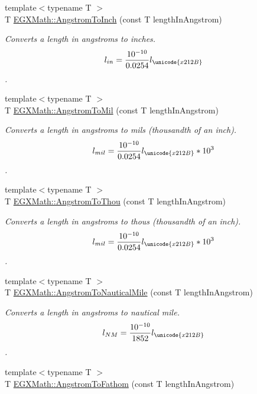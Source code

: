 \begin{DoxyCompactItemize}
{\footnotesize template$<$typename T $>$ }\\T \mbox{\hyperlink{group___e_g_x_math-_conversions-_length_conversions-_non-_s_i-_angstrom-_imperial_ga7866f39e7fdf861be15eda81aa1b3f0c}{E\+G\+X\+Math\+::\+Angstrom\+To\+Inch}} (const T length\+In\+Angstrom)
\begin{DoxyCompactList}\small\item\em Converts a length in angstroms to inches. \[ l_{in}= \frac{10^{-10}}{0.0254} l_{\unicode{x212B}} \]. \end{DoxyCompactList}\item 
{\footnotesize template$<$typename T $>$ }\\T \mbox{\hyperlink{group___e_g_x_math-_conversions-_length_conversions-_non-_s_i-_angstrom-_imperial_gae8d17e18786a104634ccfa6b9f46f314}{E\+G\+X\+Math\+::\+Angstrom\+To\+Mil}} (const T length\+In\+Angstrom)
\begin{DoxyCompactList}\small\item\em Converts a length in angstroms to mils (thousandth of an inch). \[ l_{mil}= \frac{10^{-10}}{0.0254} l_{\unicode{x212B}} * 10^{3} \]. \end{DoxyCompactList}\item 
{\footnotesize template$<$typename T $>$ }\\T \mbox{\hyperlink{group___e_g_x_math-_conversions-_length_conversions-_non-_s_i-_angstrom-_imperial_gafdf126044e17b0d3e0d83e510ba11990}{E\+G\+X\+Math\+::\+Angstrom\+To\+Thou}} (const T length\+In\+Angstrom)
\begin{DoxyCompactList}\small\item\em Converts a length in angstroms to thous (thousandth of an inch). \[ l_{mil}= \frac{10^{-10}}{0.0254} l_{\unicode{x212B}} * 10^{3} \]. \end{DoxyCompactList}\item 
{\footnotesize template$<$typename T $>$ }\\T \mbox{\hyperlink{group___e_g_x_math-_conversions-_length_conversions-_non-_s_i-_angstrom-_nautical_ga4be465819cdcbfd7da046440844f5d82}{E\+G\+X\+Math\+::\+Angstrom\+To\+Nautical\+Mile}} (const T length\+In\+Angstrom)
\begin{DoxyCompactList}\small\item\em Converts a length in angstroms to nautical mile. \[ l_{NM}= \frac{10^{-10}}{1852} l_{\unicode{x212B}} \]. \end{DoxyCompactList}\item 
{\footnotesize template$<$typename T $>$ }\\T \mbox{\hyperlink{group___e_g_x_math-_conversions-_length_conversions-_non-_s_i-_angstrom-_nautical_gab7a96e419622057d8fcce5af11ae0a9a}{E\+G\+X\+Math\+::\+Angstrom\+To\+Fathom}} (const T length\+In\+Angstrom)

\end{DoxyCompactItemize}
